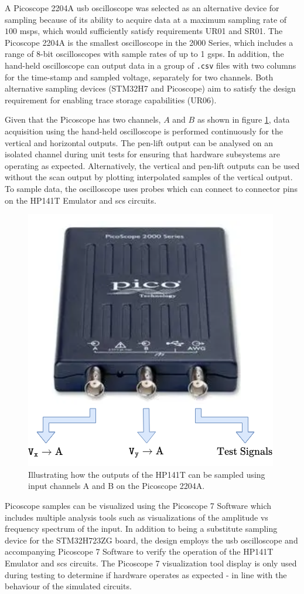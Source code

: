 \documentclass[class=report,11pt,crop=false]{standalone}
\begin{document}
	A Picoscope 2204A \acrshort{usb} oscilloscope was selected as an alternative device for sampling because of its ability to acquire data at a maximum sampling rate of $100$ \acrshort{msps}, which would sufficiently satisfy requirements UR01 and SR01. The Picoscope 2204A is the smallest oscilloscope in the 2000 Series, which includes a range of 8-bit oscilloscopes with sample rates of up to 1 \acrshort{gsps}. In addition, the hand-held oscilloscope can output data in a group of \texttt{.csv} files with two columns for the time-stamp and sampled voltage, separately for two channels. Both alternative sampling devices (STM32H7 and Picoscope) aim to satisfy the design requirement for enabling trace storage capabilities (UR06).
		
	Given that the Picoscope has two channels, $A$ and $B$ as shown in figure \ref{fig:das-picoscope}, data acquisition using the hand-held oscilloscope is performed continuously for the vertical and horizontal outputs. The pen-lift output can be analysed on an isolated channel during unit tests for ensuring that hardware subsystems are operating as expected. Alternatively, the vertical and pen-lift outputs can be used without the scan output by plotting interpolated samples of the vertical output. To sample data, the oscilloscope uses probes which can connect to connector pins on the HP141T Emulator and \acrshort{scs} circuits. 
	
	\begin{figure}[h!]
		\centering
		\includegraphics[width=0.37\linewidth]{Figures/Methodology/das-picoscope}
		\caption{Illustrating how the outputs of the HP141T can be sampled using input channels A and B on the Picoscope 2204A.}
		\label{fig:das-picoscope}
	\end{figure} 

	Picoscope samples can be visualized using the Picoscope 7 Software which includes multiple analysis tools such as visualizations of the amplitude vs frequency spectrum of the input. In addition to being a substitute sampling device for the STM32H723ZG board, the design employs the \acrshort{usb} oscilloscope and accompanying Picoscope 7 Software to verify the operation of the HP141T Emulator and \acrshort{scs} circuits. The Picoscope 7 visualization tool display is only used during testing to determine if hardware operates as expected - in line with the behaviour of the simulated circuits.
	
\end{document}
